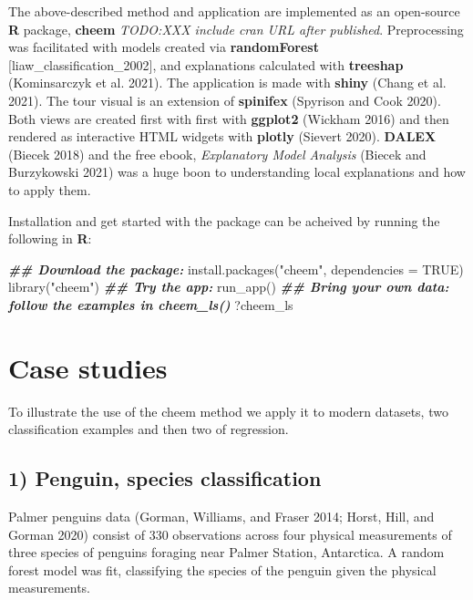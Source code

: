 \documentclass[
]{article}
\newenvironment{Shaded}{\begin{snugshade}}{\end{snugshade}}
\newcommand{\AttributeTok}[1]{\textcolor[rgb]{0.77,0.63,0.00}{#1}}
\newcommand{\ConstantTok}[1]{\textcolor[rgb]{0.00,0.00,0.00}{#1}}
\newcommand{\DocumentationTok}[1]{\textcolor[rgb]{0.56,0.35,0.01}{\textbf{\textit{#1}}}}
\newcommand{\FunctionTok}[1]{\textcolor[rgb]{0.00,0.00,0.00}{#1}}
\newcommand{\NormalTok}[1]{#1}
\newcommand{\StringTok}[1]{\textcolor[rgb]{0.31,0.60,0.02}{#1}}
\begin{document}
The above-described method and application are implemented as an open-source \textbf{R} package, \textbf{cheem} \emph{TODO:XXX include cran URL after published}. Preprocessing was facilitated with models created via \textbf{randomForest} {[}liaw\_classification\_2002{]}, and explanations calculated with \textbf{treeshap} (Kominsarczyk et al. 2021). The application is made with \textbf{shiny} (Chang et al. 2021). The tour visual is an extension of \textbf{spinifex} (Spyrison and Cook 2020). Both views are created first with first with \textbf{ggplot2} (Wickham 2016) and then rendered as interactive HTML widgets with \textbf{plotly} (Sievert 2020). \textbf{DALEX} (Biecek 2018) and the free ebook, \emph{Explanatory Model Analysis} (Biecek and Burzykowski 2021) was a huge boon to understanding local explanations and how to apply them.

Installation and get started with the package can be acheived by running the following in \textbf{R}:

\begin{Shaded}
\begin{Highlighting}[]
\DocumentationTok{\#\# Download the package:}
\FunctionTok{install.packages}\NormalTok{(}\StringTok{"cheem"}\NormalTok{, }\AttributeTok{dependencies =} \ConstantTok{TRUE}\NormalTok{)}
\FunctionTok{library}\NormalTok{(}\StringTok{"cheem"}\NormalTok{)}
\DocumentationTok{\#\# Try the app:}
\FunctionTok{run\_app}\NormalTok{()}
\DocumentationTok{\#\# Bring your own data: follow the examples in cheem\_ls()}
\NormalTok{?cheem\_ls}
\end{Highlighting}
\end{Shaded}

\hypertarget{sec:casestudies}{%
\section{Case studies}\label{sec:casestudies}}

To illustrate the use of the cheem method we apply it to modern datasets, two classification examples and then two of regression.

\hypertarget{penguin-species-classification}{%
\subsection{1) Penguin, species classification}\label{penguin-species-classification}}

Palmer penguins data (Gorman, Williams, and Fraser 2014; Horst, Hill, and Gorman 2020) consist of 330 observations across four physical measurements of three species of penguins foraging near Palmer Station, Antarctica. A random forest model was fit, classifying the species of the penguin given the physical measurements.
\end{document}

